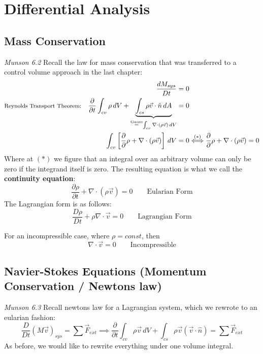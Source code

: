 \chapter{Differential Analysis}

\section{Mass Conservation}
{\footnotesize\textit{Munson 6.2}}
Recall the law for mass conservation that was transferred to a control volume approach in the last chapter:
\begin{equation*}
	\begin{split}
		\frac{dM_{sys}}{Dt}&=0\\
		\text{\footnotesize Reynolds Transport Theorem:} \quad \frac{\partial}{\partial t}\int_{cv} \rho \,dV + \underbrace{\int_{cs} \rho \vec v \cdot \hat n\,dA}_{\stackrel{\text{Gauss}}{=} \int_{cv} \nabla \cdot (\rho \vec v )\,dV} &= 0\hfill\\
		\int_{cv} \left[\frac{\partial}{\partial} \rho + \nabla \cdot (\rho \vec v)\right]\,dV &= 0 \stackrel{(*)}\Longleftrightarrow \frac{\partial}{\partial} \rho + \nabla \cdot (\rho \vec v)=0
	\end{split}
\end{equation*}
Where at $(*)$ we figure that an integral over an arbitrary volume can only be zero if the integrand itself is zero.
The resulting equation is what we call the \textbf{continuity equation}:
\begin{equation*}
	\boxed{\frac{\partial \rho}{\partial t} + \nabla \cdot \left(\rho \vec v \right) = 0}\qquad \text{Eularian Form}
\end{equation*}
The Lagrangian form is as follows:
\begin{equation*}
	\boxed{\frac{D\rho}{Dt} + \rho \nabla \cdot \vec v = 0} \qquad \text{Lagrangian Form}
\end{equation*}

For an incompressible case, where $\rho = const$, then 
\begin{equation*}
	\boxed{\nabla \cdot \vec v = 0}  \qquad \text{Incompressible}
\end{equation*}




\section{Navier-Stokes Equations (Momentum Conservation / Newtons  law)}
{\footnotesize\textit{Munson 6.3}}  Recall newtons  law for a Lagrangian system, which we rewrote to an eularian fashion:
\begin{equation*}
	\frac{D}{Dt} (M\vec v)_{sys} = \sum \vec F_{ext}\implies \frac{\partial}{\partial t} \int_{cv}\rho\vec v \,dV + \int_{cs}\rho \vec v (\vec v \cdot \hat n) = \sum \vec F_{ext}
\end{equation*}
As before, we would like to rewrite everything under one volume integral. 

